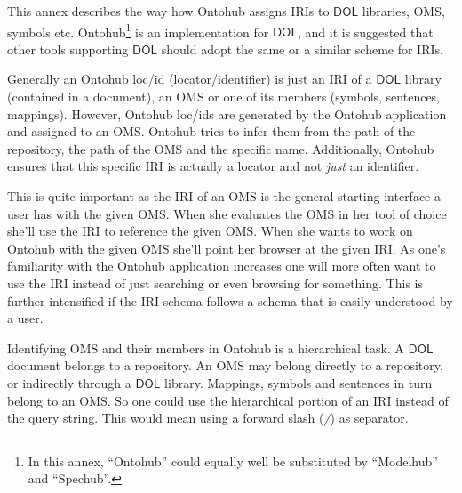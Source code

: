 \documentclass[10pt, a4paper]{isov2}
\newcommand*{\DOL}{\ensuremath{\mathsf{DOL}}\xspace}
\begin{document}
\newenvironment{oitemize}{%
  \renewcommand{\labelitemii}{$\bullet$}%
  \vspace{-15pt}
  \begin{itemize}}
  {\end{itemize}}


This annex describes the way how Ontohub assigns IRIs to \DOL
libraries, OMS, symbols etc. Ontohub\footnote{In this annex,
  ``Ontohub'' could equally well be substituted by ``Modelhub'' and
  ``Spechub''.} is  an implementation  for \DOL, and it is
suggested that other tools supporting \DOL should adopt the same or a
similar scheme for IRIs.




Generally an Ontohub loc/id (locator/identifier) is just an IRI of a
\DOL library (contained in a document), an OMS
or one of its members (symbols, sentences, mappings). However,
Ontohub loc/ids are generated by the Ontohub application and assigned to an
OMS. Ontohub tries to infer them from the path of the repository, the path of
the OMS and the specific name. Additionally, Ontohub ensures that this specific
IRI is actually a locator and not \emph{just} an identifier.

This is quite important as the IRI of an OMS is the general starting
interface a user has with the given OMS. When she evaluates the OMS
in her tool of choice she'll use the IRI to reference the given OMS. When
she wants to work on Ontohub with the given OMS she'll point her browser
at the given IRI. As one's familiarity with the Ontohub application increases one
will more often want to use the IRI instead of just searching or even browsing
for something.  This is further intensified if the IRI-schema follows a schema
that is easily understood by a user.



Identifying OMS and their members in Ontohub is a hierarchical
task. A \DOL document belongs to a repository. An OMS may belong
directly to a repository, or indirectly through a \DOL library. Mappings,
symbols and sentences in turn belong to an OMS. So one could use the
hierarchical portion of an IRI instead of the query string.  This
would mean using a forward slash (\emph{/}) as separator.
\end{document}

